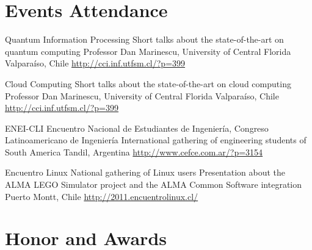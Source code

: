 \documentclass[11pt,a4paper]{moderncv}
\begin{document}
\section{Events Attendance}

        {Quantum Information Processing}
        {Short talks about the state-of-the-art on quantum computing}
        {Professor Dan Marinescu, University of Central Florida}
        {Valparaíso, Chile}
        {\url{http://cci.inf.utfsm.cl/?p=399}}
        
        {Cloud Computing}
        {Short talks about the state-of-the-art on cloud computing}
        {Professor Dan Marinescu, University of Central Florida}
        {Valparaíso, Chile}
        {\url{http://cci.inf.utfsm.cl/?p=399}}

        {ENEI-CLI}
        {Encuentro Nacional de Estudiantes de Ingeniería, Congreso Latinoamericano de Ingeniería}
        {International gathering of engineering students of South America}
        {Tandil, Argentina}
        {\url{http://www.cefce.com.ar/?p=3154}}

        {Encuentro Linux}
        {National gathering of Linux users}
        {Presentation about the ALMA LEGO Simulator project and the ALMA Common Software integration}
        {Puerto Montt, Chile}
        {\url{http://2011.encuentrolinux.cl/}}
        
\section{Honor and Awards}


\end{document}
